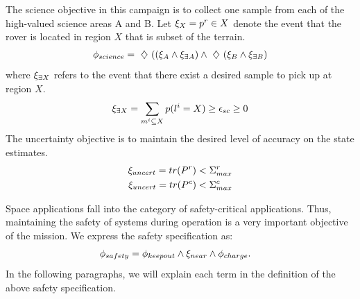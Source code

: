 \documentclass[conference]{IEEEtran}
\begin{document}
\noindent{} The science objective in this campaign is to collect one sample from each of the high-valued science areas A and B. Let $\xi_{X} = p^r \in X$ denote the event that the rover is located in region $X$ that is subset of the terrain.
    \begin{align}
        \phi_{science} = \ \diamondsuit\  ((\xi_A \land \xi_{\exists A}) \land
        \ \diamondsuit\  (\xi_B \land \xi_{\exists B})
    \end{align}
    where $\xi_{\exists X}$ refers to the event that there exist a desired sample to pick up at region $X$.
    \begin{align}
    \xi_{\exists X} = \sum_{m^i \subseteq X} p(l^i=X) \geq \epsilon_{sc}\geq 0
    \end{align}
     The uncertainty objective is to maintain the desired level of accuracy on the state estimates. 
    \begin{align}
        \nonumber\xi_{uncert} = tr(P^r) < \Sigma^r_{max}\\
        \xi_{uncert} = tr(P^c) < \Sigma^c_{max}
    \end{align}
    
   \noindent {} Space applications fall into the category of safety-critical applications. Thus, maintaining the safety of systems during operation is a very important objective of the mission. We express the safety specification as:
	\begin{align}
	   \phi_{safety} &= \phi_{keepout} \land \xi_{near} \land \phi_{charge}.
	\end{align}
	In the following paragraphs, we will explain each term in the definition of the above safety specification.
	
\end{document}
